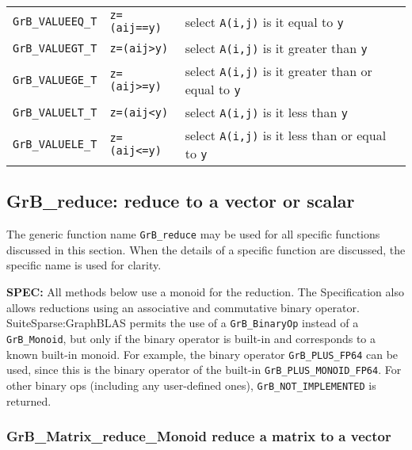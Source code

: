 \documentclass[12pt]{article}
\begin{document}
{{\begin{tabular}{lll}
\verb'GrB_VALUEEQ_T'     & \verb'z=(aij==y)'    & select \verb'A(i,j)' is it equal to \verb'y'\\
\verb'GrB_VALUEGT_T'     & \verb'z=(aij>y)'     & select \verb'A(i,j)' is it greater than \verb'y' \\
\verb'GrB_VALUEGE_T'     & \verb'z=(aij>=y)'    & select \verb'A(i,j)' is it greater than or equal to \verb'y' \\
\verb'GrB_VALUELT_T'     & \verb'z=(aij<y)'     & select \verb'A(i,j)' is it less than \verb'y' \\
\verb'GrB_VALUELE_T'     & \verb'z=(aij<=y)'    & select \verb'A(i,j)' is it less than or equal to \verb'y' \\
%
\hline
\end{tabular}
}
\vspace{0.2in}

\newpage
\subsection{{\sf GrB\_reduce:} reduce to a vector or scalar} %
\label{reduce}

The generic function name \verb'GrB_reduce' may be used for all specific
functions discussed in this section.  When the details of a specific function
are discussed, the specific name is used for clarity.

\begin{alert}
{\bf SPEC:} 
All methods below use a monoid for the reduction.  The Specification also
allows reductions using an associative and commutative binary operator.
SuiteSparse:GraphBLAS permits the use of a \verb'GrB_BinaryOp' instead of a
\verb'GrB_Monoid', but only if the binary operator is built-in and corresponds
to a known built-in monoid.  For example, the binary operator
\verb'GrB_PLUS_FP64' can be used, since this is the binary operator of the
built-in \verb'GrB_PLUS_MONOID_FP64'.  For other binary ops (including any
user-defined ones), \verb'GrB_NOT_IMPLEMENTED' is returned.

\end{alert}

\subsubsection{{\sf GrB\_Matrix\_reduce\_Monoid} reduce a matrix to a vector}
\label{reduce_to_vector}

}
\end{document}
